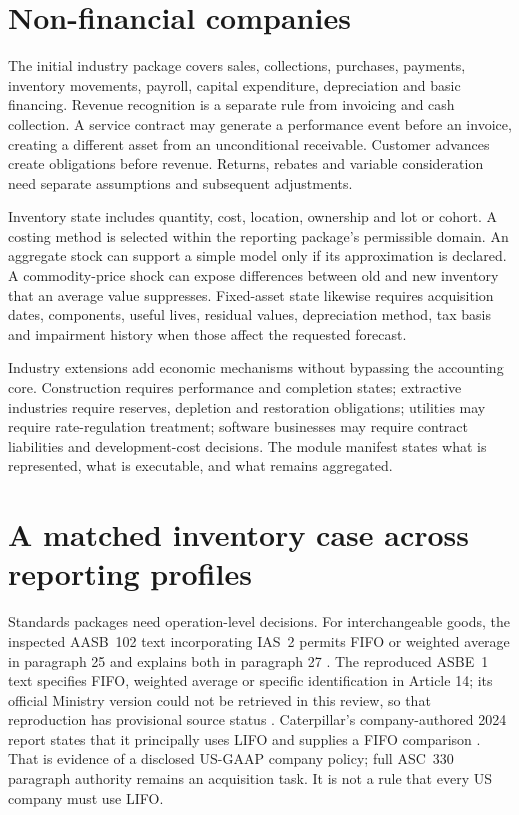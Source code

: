 \section{Non-financial companies}

The initial industry package covers sales, collections, purchases, payments,
inventory movements, payroll, capital expenditure, depreciation and basic
financing. Revenue recognition is a separate rule from invoicing and cash
collection. A service contract may generate a performance event before an
invoice, creating a different asset from an unconditional receivable. Customer
advances create obligations before revenue. Returns, rebates and variable
consideration need separate assumptions and subsequent adjustments.

Inventory state includes quantity, cost, location, ownership and lot or cohort.
A costing method is selected within the reporting package's permissible
domain. An aggregate stock can support a simple model only if its approximation
is declared. A commodity-price shock can expose differences between old and
new inventory that an average value suppresses. Fixed-asset state likewise
requires acquisition dates, components, useful lives, residual values,
depreciation method, tax basis and impairment history when those affect the
requested forecast.

Industry extensions add economic mechanisms without bypassing the accounting
core. Construction requires performance and completion states; extractive
industries require reserves, depletion and restoration obligations; utilities
may require rate-regulation treatment; software businesses may require
contract liabilities and development-cost decisions. The module manifest
states what is represented, what is executable, and what remains aggregated.

\section{A matched inventory case across reporting profiles}

Standards packages need operation-level decisions. For interchangeable goods,
the inspected AASB~102 text incorporating IAS~2 permits FIFO or weighted
average in paragraph 25 and explains both in paragraph 27
\citep{aasb102}. The reproduced ASBE~1 text specifies FIFO, weighted average
or specific identification in Article 14; its official Ministry version could
not be retrieved in this review, so that reproduction has provisional source
status \citep{asbe1copy}. Caterpillar's company-authored 2024 report states
that it principally uses LIFO and supplies a FIFO comparison
\citep[Note 1.C]{caterpillar2024}. That is evidence of a disclosed US-GAAP
company policy; full ASC~330 paragraph authority remains an acquisition task.
It is not a rule that every US company must use LIFO.

